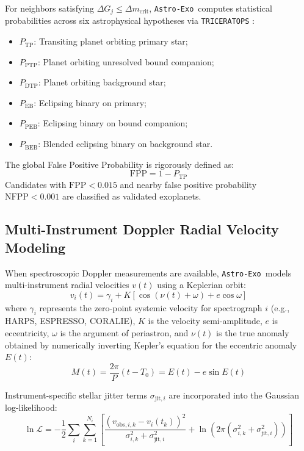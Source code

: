 \documentclass[twocolumn,trackchanges]{aastex631}
\newcommand{\astroexo}{\texttt{Astro-Exo}}
\begin{document}
For neighbors satisfying $\Delta G_j \le \Delta m_{\text{crit}}$, \astroexo\ computes statistical probabilities across six astrophysical hypotheses via \texttt{TRICERATOPS} \citep{Giacalone2021}:
\begin{itemize}
    \item $P_{\text{TP}}$: Transiting planet orbiting primary star;
    \item $P_{\text{PTP}}$: Planet orbiting unresolved bound companion;
    \item $P_{\text{DTP}}$: Planet orbiting background star;
    \item $P_{\text{EB}}$: Eclipsing binary on primary;
    \item $P_{\text{PEB}}$: Eclipsing binary on bound companion;
    \item $P_{\text{BEB}}$: Blended eclipsing binary on background star.
\end{itemize}
The global False Positive Probability is rigorously defined as:
\begin{equation}
    \mathrm{FPP} = 1 - P_{\text{TP}}
\end{equation}
Candidates with $\mathrm{FPP} < 0.015$ and nearby false positive probability $\mathrm{NFPP} < 0.001$ are classified as validated exoplanets.

\subsection{Multi-Instrument Doppler Radial Velocity Modeling}
\label{subsec:rv}

When spectroscopic Doppler measurements are available, \astroexo\ models multi-instrument radial velocities $v(t)$ using a Keplerian orbit:
\begin{equation}
    v_i(t) = \gamma_i + K \left[ \cos(\nu(t) + \omega) + e \cos \omega \right]
\end{equation}
where $\gamma_i$ represents the zero-point systemic velocity for spectrograph $i$ (e.g., HARPS, ESPRESSO, CORALIE), $K$ is the velocity semi-amplitude, $e$ is eccentricity, $\omega$ is the argument of periastron, and $\nu(t)$ is the true anomaly obtained by numerically inverting Kepler's equation for the eccentric anomaly $E(t)$:
\begin{equation}
    M(t) = \frac{2\pi}{P}(t - T_0) = E(t) - e \sin E(t)
\end{equation}

Instrument-specific stellar jitter terms $\sigma_{\text{jit}, i}$ are incorporated into the Gaussian log-likelihood:
\begin{equation}
    \ln \mathcal{L} = -\frac{1}{2} \sum_{i} \sum_{k=1}^{N_i} \left[ \frac{(v_{\text{obs}, i, k} - v_i(t_k))^2}{\sigma_{i, k}^2 + \sigma_{\text{jit}, i}^2} + \ln\left(2\pi(\sigma_{i, k}^2 + \sigma_{\text{jit}, i}^2)\right) \right]
\end{equation}
\end{document}
